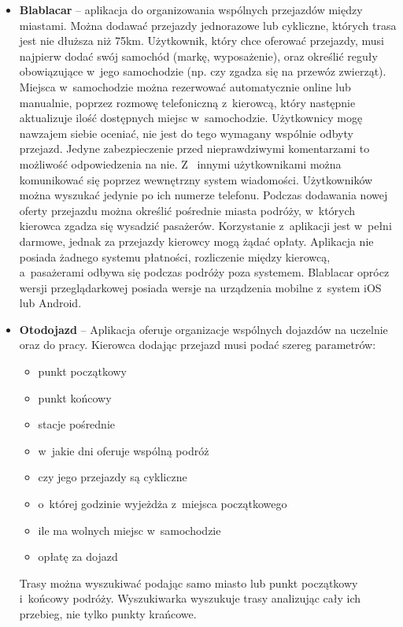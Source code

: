 \documentclass[eng,archivemode]{mgr}
\begin{document}
\begin{itemize}
	\item \textbf{Blablacar }-- aplikacja do organizowania wspólnych przejazdów między miastami. Można dodawać przejazdy jednorazowe lub cykliczne, których trasa jest nie dłuższa niż 75km. Użytkownik, który chce oferować przejazdy, musi najpierw dodać swój samochód (markę, wyposażenie), oraz określić reguły obowiązujące w~jego samochodzie (np. czy zgadza się na przewóz zwierząt). Miejsca w~samochodzie można rezerwować automatycznie online lub manualnie, poprzez rozmowę telefoniczną z~kierowcą, który następnie aktualizuje ilość dostępnych miejsc w~samochodzie. Użytkownicy mogę nawzajem siebie oceniać, nie jest do tego wymagany wspólnie odbyty przejazd. Jedyne zabezpieczenie przed nieprawdziwymi komentarzami to możliwość odpowiedzenia na nie. Z~ innymi użytkownikami można komunikować się poprzez wewnętrzny system wiadomości. Użytkowników można wyszukać jedynie po ich numerze telefonu. Podczas dodawania nowej oferty przejazdu można określić pośrednie miasta podróży, w~których kierowca zgadza się wysadzić pasażerów. Korzystanie z~aplikacji jest w~pełni darmowe, jednak za przejazdy kierowcy mogą żądać opłaty. Aplikacja nie posiada żadnego systemu płatności, rozliczenie między kierowcą, a~pasażerami odbywa się podczas podróży poza systemem. Blablacar oprócz wersji przeglądarkowej posiada wersje na urządzenia mobilne z~system iOS lub Android.
	\item \textbf{Otodojazd	}-- Aplikacja oferuje organizacje wspólnych dojazdów na uczelnie oraz do pracy. Kierowca dodając przejazd musi podać szereg parametrów:
	\begin{itemize}
		\item punkt początkowy
		\item punkt końcowy
		\item stacje pośrednie
		\item w~jakie dni oferuje wspólną podróż
		\item czy jego przejazdy są cykliczne
		\item o~której godzinie wyjeżdża z~miejsca początkowego
		\item ile ma wolnych miejsc w~samochodzie
		\item opłatę za dojazd
	\end{itemize}
	Trasy można wyszukiwać podając samo miasto lub punkt początkowy i~końcowy podróży. Wyszukiwarka wyszukuje trasy analizując cały ich przebieg, nie tylko punkty krańcowe.
	
\end{itemize}
\end{document}
